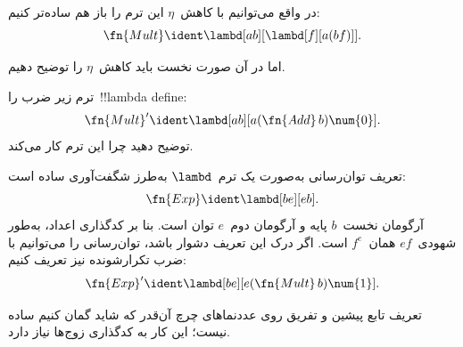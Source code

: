 \documentclass[../../../include/open-logic-section]{subfiles}
\begin{document}
\begin{editorial}
در واقع می‌توانیم با کاهش~$\eta$ این ترم را باز هم ساده‌تر کنیم:
\[
  \fn{Mult} \ident \lambd[ab][\lambd[f][a (b f)]].
\]

اما در آن صورت نخست باید کاهش~$\eta$ را توضیح دهیم.
\end{editorial}

\begin{prob}
ترم زیر ضرب را~!!{lambda define}:
\[
  \fn{Mult}' \ident \lambd[ab][a (\fn{Add}\, b) \num{0}].
\]
توضیح دهید چرا این ترم کار می‌کند.
\end{prob}

تعریف توان‌رسانی به‌صورت یک ترم~$\lambd$ به‌طرز شگفت‌آوری ساده است:
\[
  \fn{Exp} \ident \lambd[be][e b].
\]
آرگومان نخست~$b$ پایه و آرگومان دوم~$e$ توان است. بنا بر کدگذاری اعداد،
به‌طور شهودی~$e f$ همان~$f^e$ است. اگر درک این تعریف دشوار باشد،
توان‌رسانی را می‌توانیم با ضرب تکرارشونده نیز تعریف کنیم:
\[
  \fn{Exp}' \ident \lambd[be][e (\fn{Mult}\, b) \num{1}].
\]

تعریف تابع پیشین و تفریق روی عددنماهای چرچ آن‌قدر که شاید گمان کنیم
ساده نیست؛ این کار به کدگذاری زوج‌ها نیاز دارد.
\end{document}
